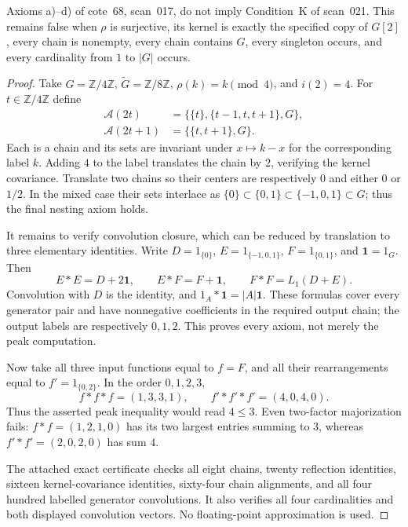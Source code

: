 \begin{theorem}
\label{C:K-counterexample}
Axioms a)--d) of cote~68, scan~017, do not imply Condition~K of scan~021. This remains false when $\rho$ is surjective, its kernel is exactly the specified copy of $G[2]$, every chain is nonempty, every chain contains $G$, every singleton occurs, and every cardinality from $1$ to $|G|$ occurs.
\end{theorem}
\begin{proof}
Take $G=\mathbb Z/4\mathbb Z$, $\widetilde G=\mathbb Z/8\mathbb Z$,
$\rho(k)=k\pmod4$, and $i(2)=4$. For $t\in\mathbb Z/4\mathbb Z$ define
\begin{align*}
\mathcal A(2t)&=\bigl\{\{t\},\{t-1,t,t+1\},G\bigr\},\\
\mathcal A(2t+1)&=\bigl\{\{t,t+1\},G\bigr\}.
\end{align*}
Each is a chain and its sets are invariant under $x\mapsto k-x$ for the corresponding label $k$. Adding $4$ to the label translates the chain by $2$, verifying the kernel covariance. Translate two chains so their centers are respectively $0$ and either $0$ or $1/2$. In the mixed case their sets interlace as
$\{0\}\subset\{0,1\}\subset\{-1,0,1\}\subset G$;
thus the final nesting axiom holds.

It remains to verify convolution closure, which can be reduced by translation to three elementary identities. Write $D=1_{\{0\}}$, $E=1_{\{-1,0,1\}}$, $F=1_{\{0,1\}}$, and $\mathbf1=1_G$. Then
\[
E*E=D+2\mathbf1,\qquad
E*F=F+\mathbf1,\qquad
F*F=L_1(D+E).
\]
Convolution with $D$ is the identity, and $1_A*\mathbf1=|A|\mathbf1$. These formulas cover every generator pair and have nonnegative coefficients in the required output chain; the output labels are respectively $0,1,2$. This proves every axiom, not merely the peak computation.

Now take all three input functions equal to $f=F$, and all their rearrangements equal to $f'=1_{\{0,2\}}$. In the order $0,1,2,3$,
\[
f*f*f=(1,3,3,1),\qquad f'*f'*f'=(4,0,4,0).
\]
Thus the asserted peak inequality would read $4\leq3$. Even two-factor majorization fails: $f*f=(1,2,1,0)$ has its two largest entries summing to $3$, whereas $f'*f'=(2,0,2,0)$ has sum $4$.

The attached exact certificate checks all eight chains, twenty reflection identities, sixteen kernel-covariance identities, sixty-four chain alignments, and all four hundred labelled generator convolutions. It also verifies all four cardinalities and both displayed convolution vectors. No floating-point approximation is used.
\end{proof}

